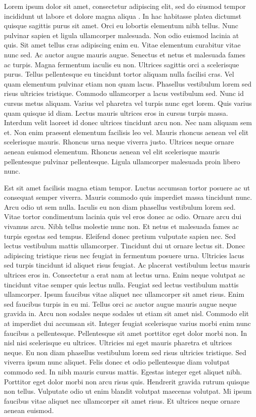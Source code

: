 \documentclass[12pt]{article}
\begin{document}
\par Lorem ipsum dolor sit amet, consectetur adipiscing elit, sed do eiusmod tempor incididunt ut labore et dolore magna aliqua \cite{Possantti2023}. In hac habitasse platea dictumst quisque sagittis purus sit amet. Orci eu lobortis elementum nibh tellus. Nunc pulvinar sapien et ligula ullamcorper malesuada. Non odio euismod lacinia at quis. Sit amet tellus cras adipiscing enim eu. Vitae elementum curabitur vitae nunc sed. Ac auctor augue mauris augue. Senectus et netus et malesuada fames ac turpis. Magna fermentum iaculis eu non. Ultrices sagittis orci a scelerisque purus. Tellus pellentesque eu tincidunt tortor aliquam nulla facilisi cras. Vel quam elementum pulvinar etiam non quam lacus. Phasellus vestibulum lorem sed risus ultricies tristique. Commodo ullamcorper a lacus vestibulum sed. Nunc id cursus metus aliquam. Varius vel pharetra vel turpis nunc eget lorem. Quis varius quam quisque id diam. Lectus mauris ultrices eros in cursus turpis massa. Interdum velit laoreet id donec ultrices tincidunt arcu non. Nec nam aliquam sem et. Non enim praesent elementum facilisis leo vel. Mauris rhoncus aenean vel elit scelerisque mauris. Rhoncus urna neque viverra justo. Ultrices neque ornare aenean euismod elementum. Rhoncus aenean vel elit scelerisque mauris pellentesque pulvinar pellentesque. Ligula ullamcorper malesuada proin libero nunc.

\par Est sit amet facilisis magna etiam tempor. Luctus accumsan tortor posuere ac ut consequat semper viverra. Mauris commodo quis imperdiet massa tincidunt nunc. Arcu odio ut sem nulla. Iaculis eu non diam phasellus vestibulum lorem sed. Vitae tortor condimentum lacinia quis vel eros donec ac odio. Ornare arcu dui vivamus arcu. Nibh tellus molestie nunc non. Et netus et malesuada fames ac turpis egestas sed tempus. Eleifend donec pretium vulputate sapien nec. Sed lectus vestibulum mattis ullamcorper. Tincidunt dui ut ornare lectus sit. Donec adipiscing tristique risus nec feugiat in fermentum posuere urna. Ultricies lacus sed turpis tincidunt id aliquet risus feugiat. Ac placerat vestibulum lectus mauris ultrices eros in. Consectetur a erat nam at lectus urna. Enim neque volutpat ac tincidunt vitae semper quis lectus nulla. Feugiat sed lectus vestibulum mattis ullamcorper. Ipsum faucibus vitae aliquet nec ullamcorper sit amet risus. Enim sed faucibus turpis in eu mi. Tellus orci ac auctor augue mauris augue neque gravida in. Arcu non sodales neque sodales ut etiam sit amet nisl. Commodo elit at imperdiet dui accumsan sit. Integer feugiat scelerisque varius morbi enim nunc faucibus a pellentesque. Pellentesque sit amet porttitor eget dolor morbi non. In nisl nisi scelerisque eu ultrices. Ultricies mi eget mauris pharetra et ultrices neque. Eu non diam phasellus vestibulum lorem sed risus ultricies tristique. Sed viverra ipsum nunc aliquet. Felis donec et odio pellentesque diam volutpat commodo sed. In nibh mauris cursus mattis. Egestas integer eget aliquet nibh. Porttitor eget dolor morbi non arcu risus quis. Hendrerit gravida rutrum quisque non tellus. Vulputate odio ut enim blandit volutpat maecenas volutpat. Mi ipsum faucibus vitae aliquet nec ullamcorper sit amet risus. Et ultrices neque ornare aenean euismod.
\end{document}
